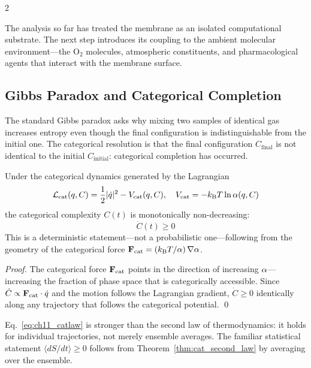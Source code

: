 \begin{multicols}{2}

The analysis so far has treated the membrane as an isolated computational substrate. The next step introduces its coupling to the ambient molecular environment---the O$_2$ molecules, atmospheric constituents, and pharmacological agents that interact with the membrane surface.

\subsection{Gibbs Paradox and Categorical Completion}

The standard Gibbs paradox asks why mixing two samples of identical gas increases entropy even though the final configuration is indistinguishable from the initial one. The categorical resolution is that the final configuration $C_{\mathrm{final}}$ is not identical to the initial $C_{\mathrm{initial}}$: categorical completion has occurred.

\begin{theorem}
\label{thm:cat_second_law}
Under the categorical dynamics generated by the Lagrangian
\begin{equation}
\mathcal{L}_{\mathrm{cat}}(q, C) = \frac{1}{2}|\dot{q}|^2 - V_{\mathrm{cat}}(q, C), \quad V_{\mathrm{cat}} = -k_{\mathrm{B}} T\ln\alpha(q, C)
\label{eq:ch11_catlag}
\end{equation}
the categorical complexity $C(t)$ is monotonically non-decreasing:
\begin{equation}
\dot{C}(t) \geq 0
\label{eq:ch11_catlaw}
\end{equation}
This is a deterministic statement---not a probabilistic one---following from the geometry of the categorical force $\mathbf{F}_{\mathrm{cat}} = (k_{\mathrm{B}} T / \alpha)\,\nabla\alpha$.
\end{theorem}

\begin{proof}
The categorical force $\mathbf{F}_{\mathrm{cat}}$ points in the direction of increasing $\alpha$---increasing the fraction of phase space that is categorically accessible. Since $\dot{C} \propto \mathbf{F}_{\mathrm{cat}} \cdot \dot{q}$ and the motion follows the Lagrangian gradient, $\dot{C} \geq 0$ identically along any trajectory that follows the categorical potential. \qed
\end{proof}

Eq.~\ref{eq:ch11_catlaw} is stronger than the second law of thermodynamics: it holds for individual trajectories, not merely ensemble averages. The familiar statistical statement $\langle dS/dt \rangle \geq 0$ follows from Theorem~\ref{thm:cat_second_law} by averaging over the ensemble.


\end{multicols}
